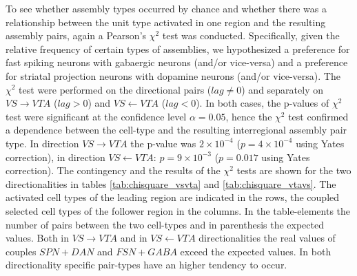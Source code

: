 To see whether assembly types occurred by chance and whether there was a relationship between the unit type activated in one region and the resulting assembly pairs, again a Pearson's $\chi^2$ test was conducted. Specifically, given the relative frequency of certain types of assemblies, we hypothesized a preference for fast spiking neurons with gabaergic neurons (and/or vice-versa) and a preference for striatal projection neurons with dopamine neurons (and/or vice-versa). The $\chi^2$ test were performed on the directional pairs ($lag\neq0$) and separately on $VS\rightarrow VTA$ ($lag>0$) and $VS\leftarrow VTA$ ($lag<0$). In both cases, the p-values of $\chi^2$ test were significant at the confidence level $\alpha = 0.05$, hence the $\chi^2$ test confirmed a dependence between the cell-type and the resulting interregional assembly pair type. In direction $VS\rightarrow VTA$ the p-value was $2\times10^{-4}$ ($p=4\times10^{-4}$ using Yates correction), in direction $VS\leftarrow VTA$: $p=9\times10^{-3}$ ($p=0.017$ using Yates correction). The contingency and the results of the $\chi^2$ tests are shown for the two directionalities in tables \ref{tab:chisquare_vsvta} and \ref{tab:chisquare_vtavs}. The activated cell types of the leading region are indicated in the rows, the coupled selected cell types of the follower region in the columns. In the table-elements the number of pairs between the two cell-types and in parenthesis the expected values. Both in $VS\rightarrow VTA$ and in $VS\leftarrow VTA$ directionalities the real values of couples $SPN+DAN$ and $FSN+GABA$ exceed the expected values. In both directionality specific pair-types have an higher tendency to occur.
